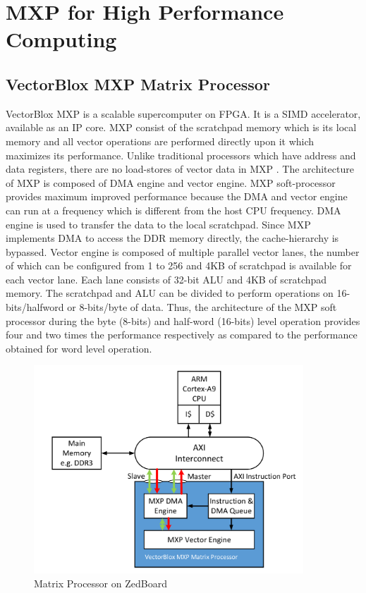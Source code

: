 \newpage
\chapter{MXP for High Performance Computing}

\section{VectorBlox MXP Matrix Processor}
VectorBlox MXP is a scalable supercomputer on FPGA. It is a SIMD accelerator, available as an IP core. MXP consist of the scratchpad memory which is its local memory and all vector operations are performed directly upon it which maximizes its performance. Unlike traditional processors which have address and data registers, there are no load-stores of vector data in MXP \cite{19}. The architecture of MXP is composed of DMA engine and vector engine. MXP soft-processor provides maximum improved performance because the DMA and vector engine can run at a frequency which is different from the host CPU frequency. DMA engine is used to transfer the data to the local scratchpad. Since MXP implements DMA to access the DDR memory directly, the cache-hierarchy is bypassed. Vector engine is composed of multiple parallel vector lanes, the number of which can be configured from 1 to 256 and 4KB of scratchpad is available for each vector lane. Each lane consists of 32-bit ALU and 4KB of scratchpad memory. The scratchpad and ALU can be divided to perform operations on 16-bits/halfword or 8-bits/byte of data. Thus, the architecture of the MXP soft processor during the byte (8-bits) and half-word (16-bits) level operation provides four and two times the performance respectively as compared to the performance obtained for word level operation. 

\begin{figure}
	\centering
	\includegraphics[width=0.9\textwidth]{images/mxp_diagram.pdf}
	\caption{Matrix Processor on ZedBoard\cite{19}}
	\label{zynq:mat}
\end{figure}

